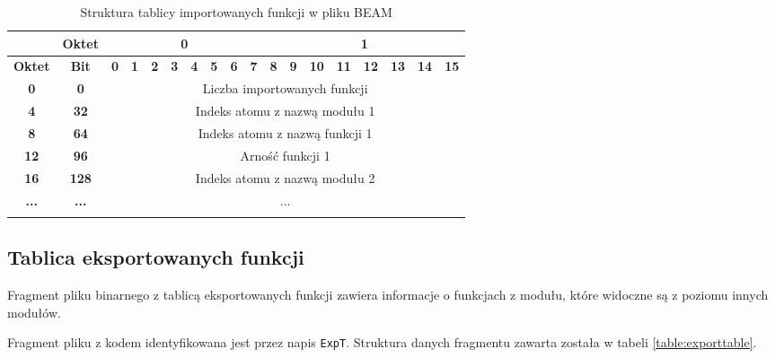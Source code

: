 \begin{longtable}{|c|c|c|c|c|c|c|c|c|c|c|c|c|c|c|c|c|c|}
\hline
         & \textbf{Oktet} & \multicolumn{8}{|c|}{\textbf{0}} & \multicolumn{8}{|c|}{\textbf{1}} \\
\hline
\textbf{Oktet} & \textbf{Bit} & \textbf{0} & \textbf{1} & \textbf{2} & \textbf{3} & \textbf{4} & \textbf{5} & \textbf{6} & \textbf{7} & \textbf{8} & \textbf{9} & \textbf{10} & \textbf{11} & \textbf{12} & \textbf{13} & \textbf{14} & \textbf{15}\\
\hline
\textbf{0} & \textbf{0} & \multicolumn{16}{|c|}{Liczba importowanych funkcji} \\[2ex]
\hline
\textbf{4} & \textbf{32} & \multicolumn{16}{|c|}{Indeks atomu z nazwą modułu 1}\\[2ex]
\hline
\textbf{8} & \textbf{64} & \multicolumn{16}{|c|}{Indeks atomu z nazwą funkcji 1} \\[2ex]
\hline
\textbf{12} & \textbf{96} & \multicolumn{16}{|c|}{Arność funkcji 1}\\[2ex]
\hline
\textbf{16} & \textbf{128} & \multicolumn{16}{|c|}{Indeks atomu z nazwą modułu 2}\\[2ex]
\hline
\textbf{...} & \textbf{...} & \multicolumn{16}{|c|}{...}  \\[10ex]
\hline
\caption{Struktura tablicy importowanych funkcji w pliku BEAM}
\label{table:importtable} \\
\end{longtable}

\subsection{Tablica eksportowanych funkcji}
Fragment pliku binarnego z tablicą eksportowanych funkcji zawiera informacje o funkcjach z modułu, które widoczne są z poziomu innych modułów.

Fragment pliku z kodem identyfikowana jest przez napis \texttt{ExpT}. Struktura danych fragmentu zawarta została w tabeli \ref{table:exporttable}.

